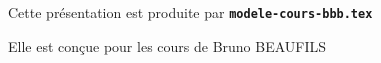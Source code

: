   \item Cette présentation est produite par \texttt{\textbf{modele-cours-bbb.tex}}
  \item Elle est conçue pour les cours de Bruno BEAUFILS
